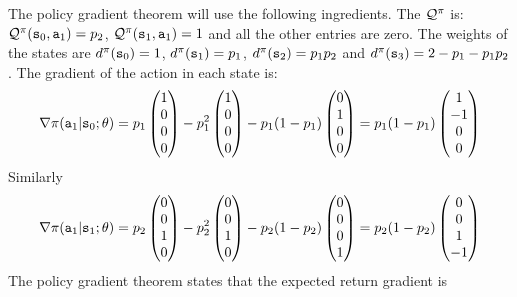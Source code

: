 \begin{example}
The policy gradient theorem will use the following ingredients. The
$\mathcal{Q}^\pi$ is: $\mathcal{Q}^\pi({\tt s}_0,{\tt a}_1)=p_2$,
$\mathcal{Q}^\pi({\tt s}_1,{\tt a}_1)=1$ and all the other entries are
zero. The weights of the states are $d^{\pi}({\tt s}_0)=1$,
$d^{\pi}({\tt s}_1)=p_1$, $d^{\pi}({\tt s}_2)=p_1 p_2$ and
$d^{\pi}({\tt s}_3)=2-p_1-p_1 p_2$. The gradient of the action in each
state is:
\[
\nabla \pi({\tt a}_1|{\tt s}_0;\theta)=
p_1\begin{pmatrix}1\\0\\0\\0\end{pmatrix} - p^2_1
\begin{pmatrix}1\\0\\0\\0\end{pmatrix} - p_1(1-p_1)
\begin{pmatrix}0\\1\\0\\0\end{pmatrix} = p_1(1-p_1)\begin{pmatrix}1\\-1\\0\\0\end{pmatrix}
\]
Similarly
\[
\nabla \pi({\tt a}_1|{\tt s}_1;\theta)=
p_2\begin{pmatrix}0\\0\\1\\0\end{pmatrix} - p_2^2
\begin{pmatrix}0\\0\\1\\0\end{pmatrix} - p_2(1-p_2)
\begin{pmatrix}0\\0\\0\\1\end{pmatrix} = p_2(1-p_2)\begin{pmatrix}0\\0\\1\\-1\end{pmatrix}
\]
The policy gradient theorem states that the expected return gradient
is


\end{example}
